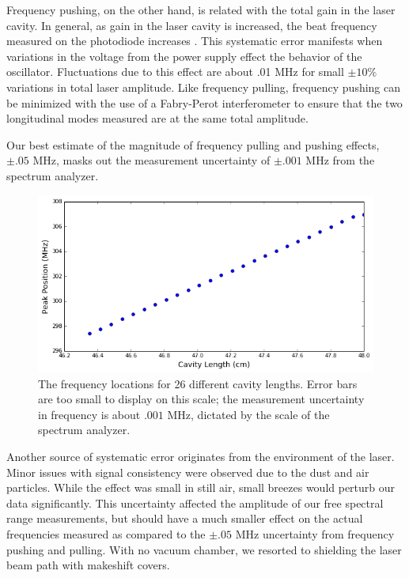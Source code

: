 \documentclass[journal, a4paper]{IEEEtran}
\begin{document}
Frequency pushing, on the other hand, is related with the total gain in the laser cavity. In general, as gain in the laser cavity is increased, the beat frequency measured on the photodiode increases \cite{beat}. This systematic error manifests when variations in the voltage from the power supply effect the behavior of the oscillator. Fluctuations due to this effect are about .01 MHz for small $\pm 10 \%$ variations in total laser amplitude.  Like frequency pulling, frequency pushing can be minimized with the use of a  Fabry-Perot interferometer to ensure that the two longitudinal modes measured are at the same total amplitude.

Our best estimate of the magnitude of frequency pulling and pushing effects, $\pm .05$ MHz, masks out the measurement uncertainty of $\pm .001$ MHz from the spectrum analyzer. 
\begin{figure}[!hbt]
		\begin{center}
		\includegraphics[width=\columnwidth]{figure_2.png}
		\caption{The frequency locations for 26 different cavity lengths. Error bars are too small to display on this scale; the measurement uncertainty in frequency is about $.001 $ MHz, dictated by the scale of the spectrum analyzer.}
		
		\label{fig:tf_plot}
		\end{center}
	\end{figure}
    
Another source of systematic error originates from the environment of the laser. Minor issues with signal consistency were observed due to the dust and air particles. While the effect was small in still air, small breezes would perturb our data significantly. This uncertainty affected the amplitude of our free spectral range measurements, but should have a much smaller effect on the actual frequencies measured as compared to the $\pm .05$ MHz uncertainty from frequency pushing and pulling. With no vacuum chamber, we resorted to shielding the laser beam path with makeshift covers.
\end{document}
